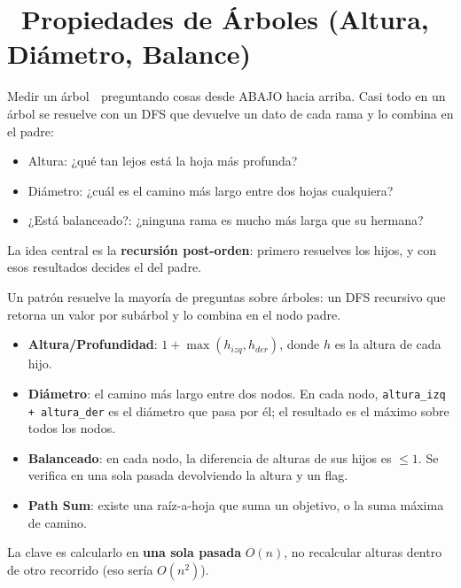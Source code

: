 \chapter[\emj{📏}~Propiedades de Árboles (Altura, Diámetro, Balance)]{~Propiedades de Árboles (Altura, Diámetro, Balance)}

\begin{dsaquees}

Medir un árbol 🌲 preguntando cosas desde ABAJO hacia arriba. Casi todo
en un árbol se resuelve con un DFS que devuelve un dato de cada rama y lo
combina en el padre:

\begin{itemize}
\item Altura: ¿qué tan lejos está la hoja más profunda?
\item Diámetro: ¿cuál es el camino más largo entre dos hojas cualquiera?
\item ¿Está balanceado?: ¿ninguna rama es mucho más larga que su hermana?
\end{itemize}

La idea central es la \textbf{recursión post-orden}: primero resuelves
los hijos, y con esos resultados decides el del padre.

\end{dsaquees}

\begin{dsaotraforma}

Un patrón resuelve la mayoría de preguntas sobre árboles: un DFS
recursivo que retorna un valor por subárbol y lo combina en el nodo
padre.

\begin{itemize}
\item \textbf{Altura/Profundidad}: $1 + \max(h_{izq}, h_{der})$, donde
      $h$ es la altura de cada hijo.
\item \textbf{Diámetro}: el camino más largo entre dos nodos. En cada
      nodo, \verb|altura_izq + altura_der| es el diámetro que pasa por
      él; el resultado es el máximo sobre todos los nodos.
\item \textbf{Balanceado}: en cada nodo, la diferencia de alturas de sus
      hijos es $\le 1$. Se verifica en una sola pasada devolviendo la
      altura y un flag.
\item \textbf{Path Sum}: existe una raíz-a-hoja que suma un objetivo, o
      la suma máxima de camino.
\end{itemize}

La clave es calcularlo en \textbf{una sola pasada} $O(n)$, no recalcular
alturas dentro de otro recorrido (eso sería $O(n^2)$).

\end{dsaotraforma}


